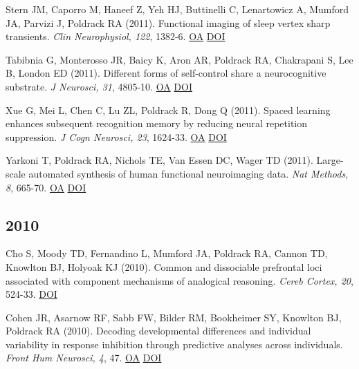 \documentclass[10pt, letterpaper]{article}
\begin{document}
Stern JM, Caporro M, Haneef Z, Yeh HJ, Buttinelli C, Lenartowicz A, Mumford JA, Parvizi J, Poldrack RA (2011). Functional imaging of sleep vertex sharp transients. \textit{Clin Neurophysiol, 122}, 1382-6. \href{https://www.ncbi.nlm.nih.gov/pmc/articles/PMC3105179}{OA} \href{http://dx.doi.org/10.1016/j.clinph.2010.12.049}{DOI} \vspace{2mm}

Tabibnia G, Monterosso JR, Baicy K, Aron AR, Poldrack RA, Chakrapani S, Lee B, London ED (2011). Different forms of self-control share a neurocognitive substrate. \textit{J Neurosci, 31}, 4805-10. \href{https://www.ncbi.nlm.nih.gov/pmc/articles/PMC3096483}{OA} \href{http://dx.doi.org/10.1523/jneurosci.2859-10.2011}{DOI} \vspace{2mm}

Xue G, Mei L, Chen C, Lu ZL, Poldrack R, Dong Q (2011). Spaced learning enhances subsequent recognition memory by reducing neural repetition suppression. \textit{J Cogn Neurosci, 23}, 1624-33. \href{https://www.ncbi.nlm.nih.gov/pmc/articles/PMC3297428}{OA} \href{http://dx.doi.org/10.1162/jocn.2010.21532}{DOI} \vspace{2mm}

Yarkoni T, Poldrack RA, Nichols TE, Van Essen DC, Wager TD (2011). Large-scale automated synthesis of human functional neuroimaging data. \textit{Nat Methods, 8}, 665-70. \href{https://www.ncbi.nlm.nih.gov/pmc/articles/PMC3146590}{OA} \href{http://dx.doi.org/10.1038/nmeth.1635}{DOI} \vspace{2mm}

\subsection*{2010}Cho S, Moody TD, Fernandino L, Mumford JA, Poldrack RA, Cannon TD, Knowlton BJ, Holyoak KJ (2010). Common and dissociable prefrontal loci associated with component mechanisms of analogical reasoning. \textit{Cereb Cortex, 20}, 524-33. \href{http://dx.doi.org/10.1093/cercor/bhp121}{DOI} \vspace{2mm}

Cohen JR, Asarnow RF, Sabb FW, Bilder RM, Bookheimer SY, Knowlton BJ, Poldrack RA (2010). Decoding developmental differences and individual variability in response inhibition through predictive analyses across individuals. \textit{Front Hum Neurosci, 4}, 47. \href{https://www.ncbi.nlm.nih.gov/pmc/articles/PMC2906202}{OA} \href{http://dx.doi.org/10.3389/fnhum.2010.00047}{DOI} \vspace{2mm}
\end{document}
